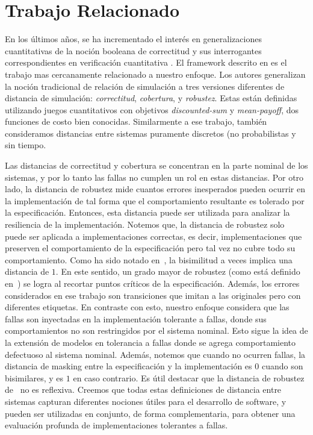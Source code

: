 \section{Trabajo Relacionado} \label{sec:related_work_mask}

En los últimos años, se ha incrementado el interés en generalizaciones cuantitativas de la noción booleana de correctitud y sus interrogantes correspondientes en verificación cuantitativa \cite{BokerCHK14,CernyHR12,Henzinger10,Henzinger13}.
El framework descrito en \cite{CernyHR12} es el trabajo mas cercanamente relacionado a nuestro enfoque. 
Los autores generalizan la noción tradicional de relación de simulación a tres versiones diferentes de distancia de simulación: \emph{correctitud}, \emph{cobertura}, y \emph{robustez}.
Estas están definidas utilizando juegos cuantitativos con objetivos \emph{discounted-sum} 
y \emph{mean-payoff}, dos funciones de costo bien conocidas.
Similarmente a ese trabajo, también consideramos distancias entre sistemas puramente discretos (no probabilistas y sin tiempo.

Las distancias de correctitud y cobertura se concentran en la parte nominal de los sistemas, y por lo tanto las fallas no cumplen un rol en estas distancias. Por otro lado, la distancia de robustez mide cuantos errores inesperados pueden ocurrir en la implementación de tal forma que el comportamiento resultante es tolerado por la especificación. Entonces, esta distancia puede ser utilizada para analizar la resiliencia de la implementación. Notemos que, la distancia de robustez solo puede ser aplicada a implementaciones correctas, es decir, implementaciones que preserven el comportamiento de la especificación pero tal vez no cubre todo su comportamiento. 
 Como ha sido notado en~\cite{CernyHR12}, la bisimilitud a veces implica una distancia de $1$. En este sentido, un grado mayor de robustez (como está definido en~\cite{CernyHR12}) se logra al recortar puntos críticos de la especificación. Además, los errores considerados en ese trabajo son transiciones que imitan a las originales pero con diferentes etiquetas. En contraste con esto, nuestro enfoque considera que las fallas son inyectadas en la implementación tolerante a fallas, donde sus comportamientos no son restringidos por el sistema nominal. Esto sigue la idea de la extensión de modelos en tolerancia a fallas donde se agrega comportamiento defectuoso al sistema nominal. Además, notemos que cuando no ocurren fallas, la distancia de masking entre la especificación y la implementación es $0$ cuando son bisimilares, y es  $1$ en caso contrario.
Es útil destacar que la distancia de robustez de~\cite{CernyHR12} no es reflexiva. Creemos que todas estas definiciones de distancia entre sistemas capturan diferentes nociones útiles para el desarrollo de software, y pueden ser utilizadas en conjunto, de forma complementaria, para obtener una evaluación profunda de implementaciones tolerantes a fallas.